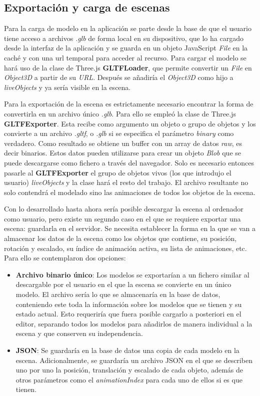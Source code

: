 \subsection{Exportación y carga de escenas}

Para la carga de modelo en la aplicación se parte desde la base de que el usuario tiene acceso a archivos \textit{.glb} de forma local en su dispositivo, que lo ha cargado desde la interfaz de la aplicación y se guarda en un objeto JavaScript \textit{File} en la caché y con una url temporal para acceder al recurso. Para cargar el modelo se hará uso de la clase de Three.js \textbf{GLTFLoader}, que permite convertir un \textit{File} en \textit{Object3D} a partir de su \textit{URL}. Después se añadiría el \textit{Object3D} como hijo a \textit{liveObjects} y ya sería visible en la escena.

Para la exportación de la escena es estrictamente necesario encontrar la forma de convertirla en un archivo único \textit{.glb}. Para ello se empleó la clase de Three.js \textbf{GLTFExporter}. Esta recibe como argumento un objeto o grupo de objetos y los convierte a un archivo \textit{.gltf}, o \textit{.glb} si se especifica el parámetro \textit{binary} como verdadero. Como resultado se obtiene un buffer con un array de datos \textit{raw}, es decir binarios. Estos datos pueden utilizarse para crear un objeto \textit{Blob} que se puede descargarse como fichero a través del navegador. Solo es necesario entonces pasarle al \textbf{GLTFExporter} el grupo de objetos vivos (los que introdujo el usuario) \textit{liveObjects} y la clase hará el resto del trabajo. El archivo resultante no solo contendrá el modelado sino las animaciones de todos los objetos de la escena.

Con lo desarrollado hasta ahora sería posible descargar la escena al ordenador como usuario, pero existe un segundo caso en el que se requiere exportar una escena: guardarla en el servidor. Se necesita establecer la forma en la que se van a almacenar los datos de la escena como los objetos que contiene, su posición, rotación y escalado, su índice de animación activa, su lista de animaciones, etc. Para ello se contemplaron dos opciones:

\begin{itemize}
    \item \textbf{Archivo binario único}: Los modelos se exportarían a un fichero similar al descargable por el usuario en el que la escena se convierte en un único modelo. El archivo sería lo que se almacenaría en la base de datos, conteniendo este toda la información sobre los modelos que se tienen y su estado actual. Esto requeriría que fuera posible cargarlo a posteriori en el editor, separando todos los modelos para añadirlos de manera individual a la escena y que conserven su independencia.
    
    \item \textbf{JSON}: Se guardaría en la base de datos una copia de cada modelo en la escena. Adicionalmente, se guardaría un archivo JSON en el que se describen uno por uno la posición, translación y escalado de cada objeto, además de otros parámetros como el \textit{animationIndex} para cada uno de ellos si es que tienen.
\end{itemize}

